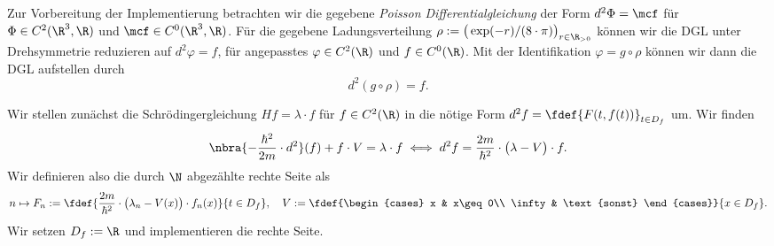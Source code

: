 \documentclass[
    oneside,
    ngerman,
    footinclude=false,
    captions=tableheading,
    DIV=12
]{scrartcl}
\begin{document}
    \aufgabe{}
        \subaufgabe{}
            Zur Vorbereitung der Implementierung betrachten wir die gegebene \emph{Poisson Differentialgleichung} der Form $d^2\Phi = \mcf$ für $\Phi\in C^2(\R^3,\R)$ und $\mcf\in C^0(\R^3,\R)$. Für die gegebene Ladungsverteilung $\rho:=\big(\exp(-r)/(8\cdot\pi)\big)_{r\in\R_{>0}}$ können wir die DGL unter Drehsymmetrie reduzieren auf $d^2\varphi = f$, für angepasstes $\varphi\in C^2(\R)$ und $f\in C^0(\R)$. Mit der Identifikation $\varphi = g\circ \rho$ können wir dann die DGL aufstellen durch 
            \[
                d^2(g\circ \rho) = f.
            \] 

        \subaufgabe{}

    \aufgabe{}
        \subaufgabe{}
            Wir stellen zunächst die Schrödingergleichung $Hf = \lambda\cdot f$ für $f\in C^2(\R)$ in die nötige Form $d^2f = \fdef{F(t,f(t))}_{t\in D_f}$ um. Wir finden 
            \begin{align*}
                \nbra{-\frac{\hbar^2}{2m}\cdot d^2}(f) + f\cdot V = \lambda\cdot f\iff d^2f = \frac{2m}{\hbar^2}\cdot\big(\lambda - V\big)\cdot f.
            \end{align*}
            Wir definieren also die durch $\N$ abgezählte rechte Seite als
            \[
                n\mapsto F_n:=\fdef{\frac{2m}{\hbar^2}\cdot\big(\lambda_n - V(x)\big)\cdot f_n(x)}{t\in D_f},\quad V:=\fdef{\begin{cases}
                    x & x\geq 0\\
                    \infty & \text{sonst}
                \end{cases}}{x\in D_f}.
            \]
            Wir setzen $D_f:=\R$ und implementieren die rechte Seite.
            
\end{document}
